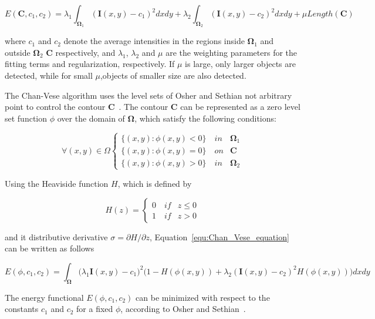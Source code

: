 \documentclass{WitsPhysicsReport}
\begin{document}
\begin{equation}
    E(\mathbf{C},c_{1},c_{2}) = \lambda_{1} \int_{\mathbf{\Omega}_{1}} (\mathbf{I}(x,y)-c_{1})^{2}dxdy +
    \lambda_{2} \int_{\mathbf{\Omega}_{2}} (\mathbf{I}(x,y)-c_{2})^{2}dxdy + \mu Length(\mathbf{C})
\label{equ:Chan_Vese_equation}
\end{equation}

where $c_{1}$ and $c_{2}$ denote the average intensities in the regions inside $\mathbf{\Omega}_{1}$ and outside $\mathbf{\Omega}_{2}$ $\mathbf{C}$ respectively, and $\lambda_{1}$, $\lambda_{2}$ and $\mu$ are the weighting parameters for the fitting terms and regularization, respectively. If $\mu$ is large, only larger objects are detected, while for small $\mu$,objects of smaller size are also detected.

The Chan-Vese algorithm uses the level sets of Osher and Sethian not arbitrary point to control the contour $\mathbf{C}$~\cite{caselles1997geodesic}.  The contour $\mathbf{C}$ can be represented as a zero level set function  $\phi$ over the domain of  $\mathbf{\Omega}$, which satisfy the following conditions:

\[ \forall (x,y) \in \Omega \begin{cases} 
      \{(x,y):\phi(x,y)  < 0 \} \quad in & \mathbf{\Omega}_{1}  \\
      \{(x,y):\phi(x,y)  = 0\} \quad on & \mathbf{C} \\
      \{(x,y):\phi(x,y)  > 0\} \quad in  & \mathbf{\Omega}_{2}
  \end{cases}
\]



Using the Heaviside function $H$, which is defined by

\[ H(z) = \begin{cases} 
      0 \quad if & z \leq 0  \\
      1 \quad if & z >   0
  \end{cases}
\]

and it distributive derivative $\sigma = \partial H/ \partial z $, Equation~\ref{equ:Chan_Vese_equation} can be written as follows

\begin{equation}
    E(\phi,c_{1},c_{2}) =  \int_{\mathbf{\Omega}} \Big ( \lambda_{1}\mathbf{I}(x,y)-c_{1})^{2}(1 - H(\phi (x,y)) +
    \lambda_{2} (\mathbf{I}(x,y)-c_{2})^{2}  H(\phi (x,y))  \big )dxdy
\label{equ:Levelset_Chan_Vese_equation}
\end{equation}

The energy functional $E(\phi,c_{1},c_{2})$ can be minimized with respect to the constants $c_{1}$ and $c_{2}$ for a fixed $\phi$, according to Osher and Sethian~\cite{caselles1997geodesic}.
\end{document}
